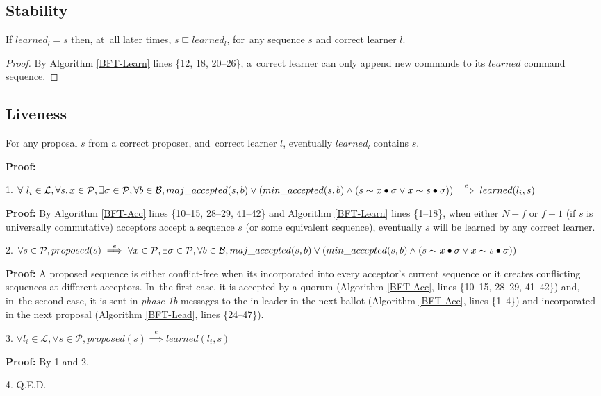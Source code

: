 \documentclass[algorithms,article,accept,moreauthors,pdftex,10pt,a4paper]{Definitions/mdpi}
\begin{document}
\subsection{Stability}
\begin{Theorem}
If $learned_l = s$ then, at~all later times, $s \sqsubseteq learned_l$, for~any sequence $s$ and correct learner $l$. 
\end{Theorem} 
\begin{proof}
By Algorithm \ref{BFT-Learn} lines \{12, 18, 20--26\}, a~correct learner can only append new commands to its $learned$ command sequence.\end{proof}

\subsection{Liveness}
\begin{Theorem}
For any proposal $s$ from a correct proposer, and~correct learner $l$, eventually $learned_l$ contains $s$.\par
\end{Theorem} 
\noindent\parbox{\linewidth}{\textbf{Proof:}} \par
\parbox{\linewidth-2mm-\algorithmicindent}{\strut1. $\forall\ l_i \in \mathcal{L},\forall s,x \in \mathcal{P}, \exists \sigma \in \mathcal{P}, \forall b \in \mathcal{B}, maj\_accepted(s,b) \lor (min\_accepted(s,b) \land (s \thicksim x \bullet \sigma \lor x \thicksim s \bullet \sigma))\overset{e}{\implies} learned(l_i,s)$}\par
\indent\indent\parbox{\linewidth-4.5mm-\algorithmicindent*2}{\strut\textbf{Proof:} By Algorithm \ref{BFT-Acc} lines \{10--15, 28--29, 41--42\} and Algorithm \ref{BFT-Learn} lines \{1--18\}, when either $N-f$ or $f+1$ (if $s$ is universally commutative) acceptors accept a sequence $s$ (or some equivalent sequence), eventually $s$ will be learned by any correct learner.}\par
\parbox{\linewidth-2mm-\algorithmicindent}{\strut2. $\forall s \in \mathcal{P}, proposed(s) \overset{e}{\implies} \forall x \in \mathcal{P}, \exists \sigma \in \mathcal{P}, \forall b \in \mathcal{B}, maj\_accepted(s,b) \lor (min\_accepted(s,b) \land (s \thicksim x \bullet \sigma \lor x \thicksim s \bullet \sigma))$} \par
\indent\indent\parbox{\linewidth-4.5mm-\algorithmicindent*2}{\strut\textbf{Proof:} A proposed sequence is either conflict-free when its incorporated into every acceptor's current sequence or it creates conflicting sequences at different acceptors. In~the first case, it is accepted by a quorum (Algorithm \ref{BFT-Acc}, lines \{10--15, 28--29, 41--42\}) and, in~the second case, it is sent in \textit{phase 1b} messages to the in leader in the next ballot (Algorithm \ref{BFT-Acc}, lines \{1--4\}) and incorporated in the next proposal (Algorithm \ref{BFT-Lead}, lines \{24--47\}).} \par
\parbox{\linewidth}{\strut3. $\forall l_i \in \mathcal{L}, \forall s \in \mathcal{P}, proposed(s) \overset{e}{\implies} learned(l_i,s)$} \par
\indent\indent\parbox{\linewidth}{\strut\textbf{Proof:} By 1 and 2.} \par
\parbox{\linewidth}{\strut4. Q.E.D.}
\end{document}
